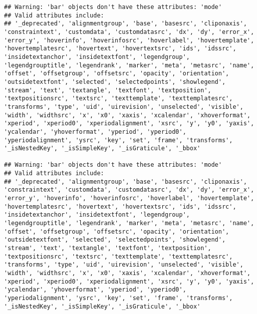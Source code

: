 \documentclass[
]{article}
\begin{document}
\begin{verbatim}
## Warning: 'bar' objects don't have these attributes: 'mode'
## Valid attributes include:
## '_deprecated', 'alignmentgroup', 'base', 'basesrc', 'cliponaxis', 'constraintext', 'customdata', 'customdatasrc', 'dx', 'dy', 'error_x', 'error_y', 'hoverinfo', 'hoverinfosrc', 'hoverlabel', 'hovertemplate', 'hovertemplatesrc', 'hovertext', 'hovertextsrc', 'ids', 'idssrc', 'insidetextanchor', 'insidetextfont', 'legendgroup', 'legendgrouptitle', 'legendrank', 'marker', 'meta', 'metasrc', 'name', 'offset', 'offsetgroup', 'offsetsrc', 'opacity', 'orientation', 'outsidetextfont', 'selected', 'selectedpoints', 'showlegend', 'stream', 'text', 'textangle', 'textfont', 'textposition', 'textpositionsrc', 'textsrc', 'texttemplate', 'texttemplatesrc', 'transforms', 'type', 'uid', 'uirevision', 'unselected', 'visible', 'width', 'widthsrc', 'x', 'x0', 'xaxis', 'xcalendar', 'xhoverformat', 'xperiod', 'xperiod0', 'xperiodalignment', 'xsrc', 'y', 'y0', 'yaxis', 'ycalendar', 'yhoverformat', 'yperiod', 'yperiod0', 'yperiodalignment', 'ysrc', 'key', 'set', 'frame', 'transforms', '_isNestedKey', '_isSimpleKey', '_isGraticule', '_bbox'

## Warning: 'bar' objects don't have these attributes: 'mode'
## Valid attributes include:
## '_deprecated', 'alignmentgroup', 'base', 'basesrc', 'cliponaxis', 'constraintext', 'customdata', 'customdatasrc', 'dx', 'dy', 'error_x', 'error_y', 'hoverinfo', 'hoverinfosrc', 'hoverlabel', 'hovertemplate', 'hovertemplatesrc', 'hovertext', 'hovertextsrc', 'ids', 'idssrc', 'insidetextanchor', 'insidetextfont', 'legendgroup', 'legendgrouptitle', 'legendrank', 'marker', 'meta', 'metasrc', 'name', 'offset', 'offsetgroup', 'offsetsrc', 'opacity', 'orientation', 'outsidetextfont', 'selected', 'selectedpoints', 'showlegend', 'stream', 'text', 'textangle', 'textfont', 'textposition', 'textpositionsrc', 'textsrc', 'texttemplate', 'texttemplatesrc', 'transforms', 'type', 'uid', 'uirevision', 'unselected', 'visible', 'width', 'widthsrc', 'x', 'x0', 'xaxis', 'xcalendar', 'xhoverformat', 'xperiod', 'xperiod0', 'xperiodalignment', 'xsrc', 'y', 'y0', 'yaxis', 'ycalendar', 'yhoverformat', 'yperiod', 'yperiod0', 'yperiodalignment', 'ysrc', 'key', 'set', 'frame', 'transforms', '_isNestedKey', '_isSimpleKey', '_isGraticule', '_bbox'


\end{verbatim}
\end{document}
